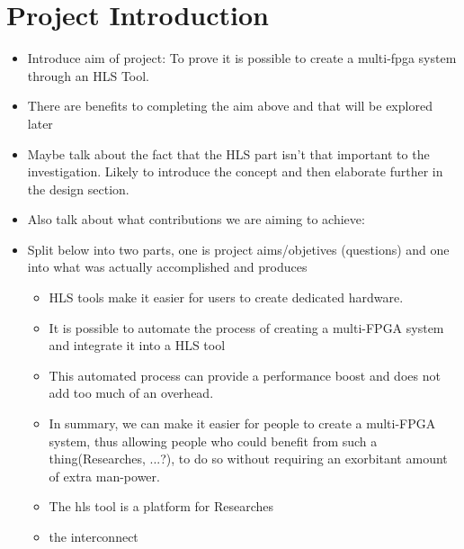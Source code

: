 \chapter{Project Introduction}

\begin{itemize}
    \item Introduce aim of project: To prove it is possible to create a multi-fpga system through an HLS Tool.
    \item There are benefits to completing the aim above and that will be explored later
    \item Maybe talk about the fact that the HLS part isn't that important to the investigation. Likely to introduce the concept and then elaborate further in the design section.
    \item Also talk about what contributions we are aiming to achieve:
    \item Split below into two parts, one is project aims/objetives (questions) and one into what was actually accomplished and produces
    \begin{itemize}
        \item HLS tools make it easier for users to create dedicated hardware.
        \item It is possible to automate the process of creating a multi-FPGA system and integrate it into a HLS tool
        \item This automated process can provide a performance boost and does not add too much of an overhead.
        \item In summary, we can make it easier for people to create a multi-FPGA system, thus allowing people who could benefit from such a thing(Researches, ...?), to do so without requiring an exorbitant amount of extra man-power.
        \item The hls tool is a platform for Researches
        \item the interconnect
    \end{itemize}
\end{itemize}